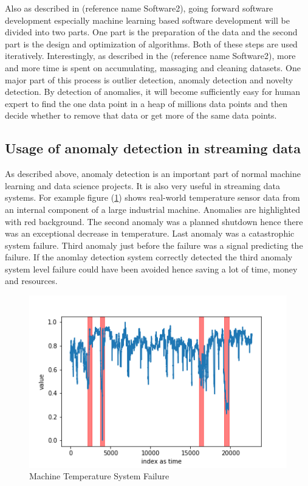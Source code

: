\documentclass[12pt]{article}
\begin{document}
\break
Also as described in (reference name Software2), going forward software development especially machine learning based software development will be divided into two parts. One part is the preparation of the data and the second part is the design and optimization of algorithms. Both of these steps are used iteratively. Interestingly, as described in the (reference name Software2), more and more time is spent on accumulating, massaging and cleaning datasets. One major part of this process is outlier detection, anomaly detection and novelty detection. By detection of anomalies, it will become sufficiently easy for human expert to find the one data point in a heap of millions data points and then decide whether to remove that data or get more of the same data points.
\subsection{Usage of anomaly detection in streaming data}
As described above, anomaly detection is an important part of normal machine learning and data science projects. It is also very useful in streaming data systems. For example figure (\ref{machineTemperatureSystemFailure}) shows real-world temperature sensor data from an internal component of a large industrial machine. Anomalies are highlighted with red background. The second anomaly was a planned shutdown  hence there was an exceptional decrease in temperature. Last anomaly was a catastrophic system failure. Third anomaly just before the failure was a signal predicting the failure. If the anomlay detection system correctly detected the third anomaly system level failure could have been avoided hence saving a lot of time, money and resources.
\begin{figure}[H]
\centering
        \includegraphics[width=\textwidth]{images/dataAnomalies/known/machine_temperature_system_failure.png}
    \caption{Machine Temperature System Failure}
    \label{machineTemperatureSystemFailure}
\end{figure}
\end{document}
